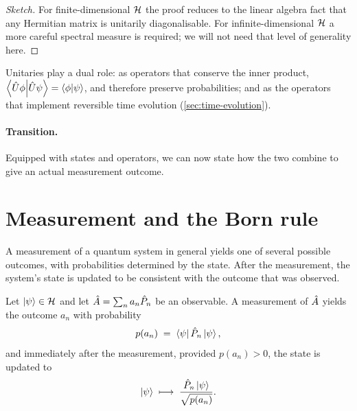 \begin{proof}[Sketch]
For finite-dimensional $\mathcal{H}$ the proof reduces to the linear
algebra fact that any Hermitian matrix is unitarily diagonalisable.
For infinite-dimensional $\mathcal{H}$ a more careful spectral measure
is required; we will not need that level of generality here.
\end{proof}

\begin{remark}
Unitaries play a dual role: as operators that conserve the inner
product,
$\braket{\hat{U}\phi}{\hat{U}\psi}=\braket{\phi}{\psi}$, and
therefore preserve probabilities; and as the operators that implement
reversible time evolution (\cref{sec:time-evolution}).
\end{remark}

\paragraph{Transition.}
Equipped with states and operators, we can now state how the two
combine to give an actual measurement outcome.

\section{Measurement and the Born rule}
\label{sec:measurement}

\begin{phenomenon}
A measurement of a quantum system in general yields one of several
possible outcomes, with probabilities determined by the state. After
the measurement, the system's state is updated to be consistent with
the outcome that was observed.
\end{phenomenon}

\begin{postulate}
\label{post:born}
Let $\ket{\psi}\in\mathcal{H}$ and let $\hat{A}=\sum_n a_n\hat{P}_n$ be
an observable. A measurement of $\hat{A}$ yields the outcome $a_n$
with probability
\begin{equation}
\label{eq:born}
p(a_n) \;=\; \bra{\psi}\hat{P}_n\ket{\psi},
\end{equation}
and immediately after the measurement, provided $p(a_n)>0$, the
state is updated to
\begin{equation}
\label{eq:projection}
\ket{\psi}\;\longmapsto\; \frac{\hat{P}_n\ket{\psi}}{\sqrt{p(a_n)}}.
\end{equation}
\end{postulate}

